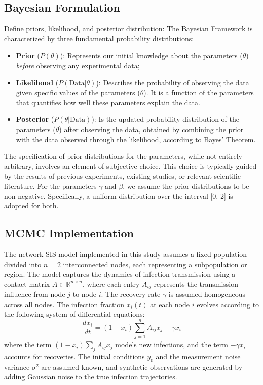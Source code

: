 \documentclass[a4paper,10pt]{report}
\begin{document}
\subsection{Bayesian Formulation}
Define priors, likelihood, and posterior distribution:
The Bayesian Framework is characterized by three fundamental probability distributions:
\begin{itemize}
    \item \textbf{Prior} ($P(\theta)$): Represents our initial knowledge about the parameters ($\theta$) \emph{before} observing any experimental data;
    \item \textbf{Likelihood} ($P(\text{Data}|\theta)$): Describes the probability of observing the data given specific values of the parameters ($\theta$). It is a function of the parameters that quantifies how well these parameters explain the data.
    \item \textbf{Posterior} ($P(\theta|\text{Data})$): Is the updated probability distribution of the parameters ($\theta$) after observing the data, obtained by combining the prior with the data observed through the likelihood, according to Bayes' Theorem.
\end{itemize}
The specification of prior distributions for the parameters, while not entirely arbitrary, involves an element of subjective choice. This choice is typically guided by the results of previous experiments, existing studies, or relevant scientific literature. For the parameters $\gamma$ and $\beta$, we assume the prior distributions to be non-negative. Specifically, a uniform distribution over the interval [0, 2] is adopted for both.
\subsection{MCMC Implementation}

The network SIS model implemented in this study assumes a fixed population divided into $n = 2$ interconnected nodes, each representing a subpopulation or region. The model captures the dynamics of infection transmission using a contact matrix $A \in \mathbb{R}^{n \times n}$, where each entry $A_{ij}$ represents the transmission influence from node $j$ to node $i$. The recovery rate $\gamma$ is assumed homogeneous across all nodes. The infection fraction $x_i(t)$ at each node $i$ evolves according to the following system of differential equations:
\[
\frac{dx_i}{dt} = (1 - x_i) \sum_{j=1}^{n} A_{ij} x_j - \gamma x_i
\]
where the term $(1 - x_i) \sum_j A_{ij} x_j$ models new infections, and the term $-\gamma x_i$ accounts for recoveries. The initial conditions $y_0$ and the measurement noise variance $\sigma^2$ are assumed known, and synthetic observations are generated by adding Gaussian noise to the true infection trajectories.
\end{document}
